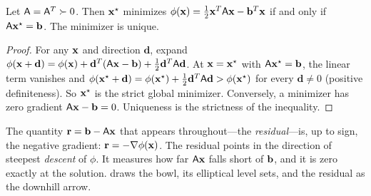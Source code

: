 \begin{proposition}
\label{prop:minimize}
Let $\mathsf{A}=\mathsf{A}^{T}\succ0$. Then $\mathbf{x}^\star$ minimizes
$\phi(\mathbf{x})=\tfrac12\mathbf{x}^{T}\mathsf{A}\mathbf{x}-\mathbf{b}^{T}\mathbf{x}$ if and only if
$\mathsf{A}\mathbf{x}^\star=\mathbf{b}$. The minimizer is unique.
\end{proposition}

\begin{proof}
For any $\mathbf{x}$ and direction $\mathbf{d}$, expand
$\phi(\mathbf{x}+\mathbf{d})=\phi(\mathbf{x})+\mathbf{d}^{T}(\mathsf{A}\mathbf{x}-\mathbf{b})+\tfrac12\mathbf{d}^{T}\mathsf{A}\mathbf{d}$. At
$\mathbf{x}=\mathbf{x}^\star$ with $\mathsf{A}\mathbf{x}^\star=\mathbf{b}$, the linear term vanishes and
$\phi(\mathbf{x}^\star+\mathbf{d})=\phi(\mathbf{x}^\star)+\tfrac12\mathbf{d}^{T}\mathsf{A}\mathbf{d}>\phi(\mathbf{x}^\star)$
for every $\mathbf{d}\neq0$ (positive definiteness). So $\mathbf{x}^\star$ is the strict global
minimizer. Conversely, a minimizer has zero gradient $\mathsf{A}\mathbf{x}-\mathbf{b}=0$.
Uniqueness is the strictness of the inequality.
\end{proof}

The quantity $\mathbf{r}=\mathbf{b}-\mathsf{A}\mathbf{x}$ that appears throughout---the
\emph{residual}---is, up to sign, the negative gradient:
$\mathbf{r}=-\nabla\phi(\mathbf{x})$. The residual points in the direction of steepest
\emph{descent} of $\phi$. It measures how far $\mathsf{A}\mathbf{x}$ falls short of $\mathbf{b}$,
and it is zero exactly at the solution.  draws the bowl, its
elliptical level sets, and the residual as the downhill arrow.

